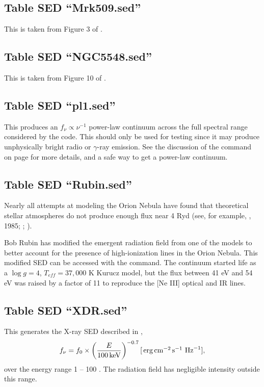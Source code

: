 \subsection{Table SED ``Mrk509.sed''}

This is taken from Figure 3 of \citet{2011A&A...534A..36K}.

\subsection{Table SED ``NGC5548.sed''}

This is taken from Figure 10 of \citet{2015A&A...575A..22M}.

\subsection{Table SED ``pl1.sed''}

This produces an $f_{\nu} \propto \nu^{-1}$ power-law continuum across the
full spectral range considered by the code.
This should only be used for testing since it may produce unphysically bright 
radio or $\gamma$-ray emission.
See the discussion of the  command on page \pageref{sec:CommandPowerLaw}
for more details, and a safe way to get a power-law continuum.

\subsection{Table SED ``Rubin.sed''}

Nearly all attempts at modeling the Orion Nebula have found that
theoretical stellar atmospheres do not produce enough flux
near 4 Ryd (see,
for example, \citealp{Mathis1982}, 1985; \citealp{Rubin1991};
\citealp{Sellmaier1996}).

Bob Rubin has modified the emergent radiation field from one of the
\citet{Kurucz1979} models to better account for the presence of
high-ionization lines in the Orion Nebula.
This modified SED can be accessed with the
 command.
The continuum started life as a
$\log g = 4$, $T_{eff} = 37{,}000$
K Kurucz model, but the flux between 41 eV and 54 eV was raised
by a factor of 11 to reproduce the [Ne III] optical and IR lines.

\subsection{Table SED ``XDR.sed''}

This generates the X-ray SED described in 
\citet{Maloney1996},
\begin{equation}
f_{\nu}  = f_0 \times
\left( {\frac{{E }}{{100 {\rm\thinspace keV}}}} \right)^{-0.7} 
[\mbox{${\rm\thinspace erg}{\rm\thinspace cm}^{-2}{\rm\thinspace s}^{-1}\,$} {\rm\thinspace Hz}^{-1}] ,
\end{equation}
over the energy range 1 -- 100 \keV .
The radiation field has negligible intensity outside this range.

